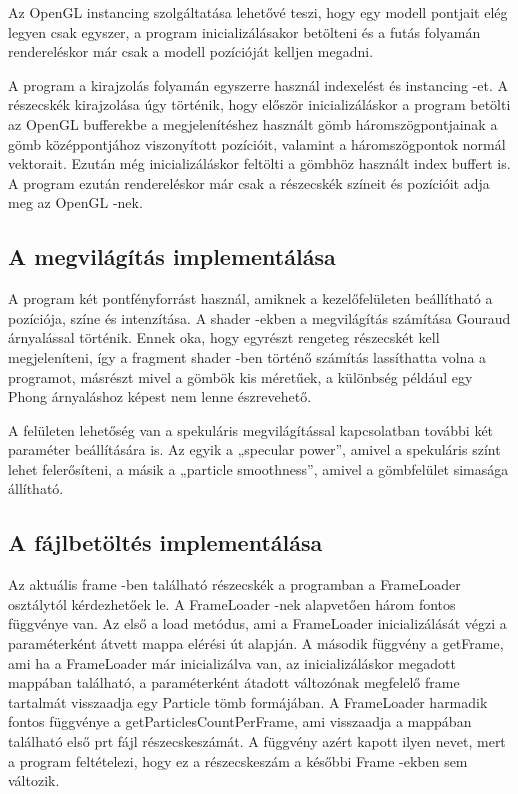 \vspace{3mm}


\vspace{3mm}

Az OpenGL instancing szolgáltatása lehetővé teszi, 
hogy egy modell pontjait elég legyen csak egyszer, 
a program inicializálásakor betölteni és a futás folyamán 
rendereléskor már csak a modell pozícióját kelljen megadni.

A program a kirajzolás folyamán egyszerre használ indexelést és instancing -et. 
A részecskék kirajzolása úgy történik, 
hogy először inicializáláskor a program betölti 
az OpenGL bufferekbe a megjelenítéshez használt gömb háromszögpontjainak 
a gömb középpontjához viszonyított pozícióit, 
valamint a háromszögpontok normál vektorait. 
Ezután még inicializáláskor feltölti 
a gömbhöz használt index buffert is. 
A program ezután rendereléskor már csak 
a részecskék színeit és pozícióit adja meg az OpenGL -nek.

\subsection{A megvilágítás implementálása}

A program két pontfényforrást használ, 
amiknek a kezelőfelületen beállítható a pozíciója, 
színe és intenzítása. 
A shader -ekben a megvilágítás számítása Gouraud árnyalással történik. 
Ennek oka, 
hogy egyrészt rengeteg részecskét kell megjeleníteni, 
így a fragment shader -ben történő 
számítás lassíthatta volna a programot, 
másrészt mivel a gömbök kis méretűek, 
a különbség például egy Phong árnyaláshoz képest 
nem lenne észrevehető. 

A felületen lehetőség van 
a spekuláris megvilágítással kapcsolatban további 
két paraméter beállítására is. 
Az egyik a {\ttfamily „specular power”}, 
amivel a spekuláris színt lehet felerősíteni, 
a másik a {\ttfamily „particle smoothness”}, 
amivel a gömbfelület simasága állítható.

\subsection{A fájlbetöltés implementálása}

Az aktuális frame -ben található részecskék a programban a 
{\ttfamily FrameLoader} osztálytól kérdezhetőek le. 
A {\ttfamily FrameLoader} -nek alapvetően három fontos függvénye van. 
Az első a {\ttfamily load} metódus, 
ami a {\ttfamily FrameLoader} inicializálását végzi
a paraméterként átvett mappa elérési út alapján.
A második függvény a {\ttfamily getFrame}, 
ami ha a {\ttfamily FrameLoader} már inicializálva van, 
az inicializáláskor megadott mappában található, 
a paraméterként átadott változónak megfelelő frame
tartalmát visszaadja egy {\ttfamily Particle} tömb formájában. 
A {\ttfamily FrameLoader} harmadik fontos függvénye 
a {\ttfamily getParticlesCountPerFrame}, 
ami visszaadja a mappában található első prt fájl részecskeszámát. 
A függvény azért kapott ilyen nevet, mert a program feltételezi, 
hogy ez a részecskeszám a későbbi {\ttfamily Frame} -ekben sem változik.

